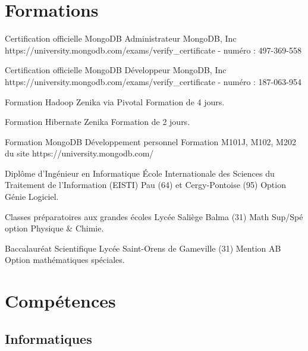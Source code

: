 \documentclass[11pt,a4paper]{moderncv}
\begin{document}
\section{Formations}

{Certification officielle MongoDB Administrateur}
{MongoDB, Inc}
{}
{}
{https://university.mongodb.com/exams/verify\_certificate - numéro : 497-369-558}

{Certification officielle MongoDB Développeur}
{MongoDB, Inc}
{}
{}
{https://university.mongodb.com/exams/verify\_certificate - numéro : 187-063-954}

{Formation Hadoop}
{Zenika via Pivotal}
{}
{}
{Formation de 4 jours.}

{Formation Hibernate}
{Zenika}
{}
{}
{Formation de 2 jours.}

{Formation MongoDB}
{Développement personnel}
{}
{}
{Formation M101J, M102, M202 du site https://university.mongodb.com/}

{Diplôme d'Ingénieur en Informatique}
{\'Ecole Internationale des Sciences du Traitement de l’Information (EISTI)}
{Pau (64) et Cergy-Pontoise (95)}
{}
{Option Génie Logiciel.}

{Classes préparatoires aux grandes écoles}
{Lycée Saliège}
{Balma (31)}
{}
{Math Sup/Spé option Physique \& Chimie.}

{Baccalauréat Scientifique}
{Lycée}
{Saint-Orens de Gameville (31)}
{Mention AB}
{Option mathématiques spéciales.}

\section{Compétences}

\subsection{Informatiques}
\end{document}
